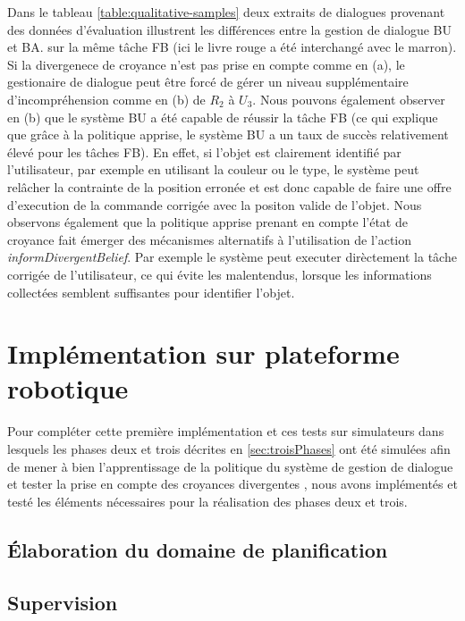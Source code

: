 \documentclass[a4paper,11pt,twoside]{StyleThese}
\begin{document}
%
Dans le tableau \ref{table:qualitative-samples} deux extraits de dialogues provenant des données d'évaluation illustrent les différences entre la gestion de dialogue BU et BA. sur la même tâche FB (ici le livre rouge a été interchangé avec le marron). Si la divergenece de croyance n'est pas prise en compte comme en (a), le gestionaire de dialogue peut être forcé de gérer un niveau supplémentaire d'incompréhension comme en (b) de $R_2$ à $U_3$. 
Nous pouvons également observer en (b) que le système BU a été capable de réussir la tâche FB (ce qui explique que grâce à la politique apprise, le système BU a un taux de succès relativement élevé pour les tâches FB). En effet, si l'objet est clairement identifié par l'utilisateur, par exemple en utilisant la couleur ou le type, le système peut relâcher la contrainte de la position erronée et est donc capable de faire une offre d'execution de la commande corrigée avec la positon valide de l'objet.
Nous observons également que la politique apprise prenant en compte l'état de croyance fait émerger des mécanismes alternatifs à l'utilisation de l'action \textit{informDivergentBelief}. Par exemple le système peut executer dirèctement la tâche corrigée de l'utilisateur, ce qui évite les malentendus, lorsque les informations collectées semblent suffisantes pour identifier l'objet.



\section{Implémentation sur plateforme robotique}


Pour compléter cette première implémentation et ces tests sur simulateurs dans lesquels les phases deux et trois décrites en \ref{sec:troisPhases} ont été simulées afin de mener à bien l'apprentissage de la politique du système de gestion de dialogue \cite{simpar_2014} et tester la prise en compte des croyances divergentes \cite{Ferreira2015}, nous avons implémentés et testé les éléments nécessaires pour la réalisation des phases deux et trois.


\subsection{Élaboration du domaine de planification}




\subsection{Supervision}
\end{document}
